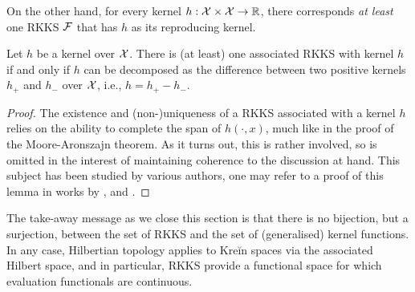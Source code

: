 On the other hand, for every kernel $h:{\mathcal X}\times{\mathcal X}\to\mathbb{R}$, there corresponds \emph{at least} one RKKS ${\mathcal F}$ that has $h$ as its reproducing kernel.

\begin{lemma}
  Let $h$ be a kernel over ${\mathcal X}$.
  There is (at least) one associated RKKS with kernel $h$ if and only if $h$ can be decomposed as the difference between two positive kernels $h_+$ and $h_-$ over ${\mathcal X}$, i.e., $h=h_+-h_-$.
\end{lemma}

\begin{proof}
  The existence and (non-)uniqueness of a RKKS associated with a kernel $h$ relies on the ability to complete the span of $h(\cdot,x)$, much like in the proof of the Moore-Aronszajn theorem.
  As it turns out, this is rather involved, so is omitted in the interest of maintaining coherence to the discussion at hand.
  This subject has been studied by various authors, one may refer to a proof of this lemma in works by \citet[Theorem 2 \& Example in Section 4]{alpay1991some}, and \citet[Theorem 2.28]{mary2003hilbertian}.
\end{proof}

The take-away message as we close this section is that there is no bijection, but a surjection, between the set of RKKS and the set of (generalised) kernel functions.
In any case, Hilbertian topology applies to Kreĭn spaces via the associated Hilbert space, and in particular, RKKS provide a functional space for which evaluation functionals are continuous.





















